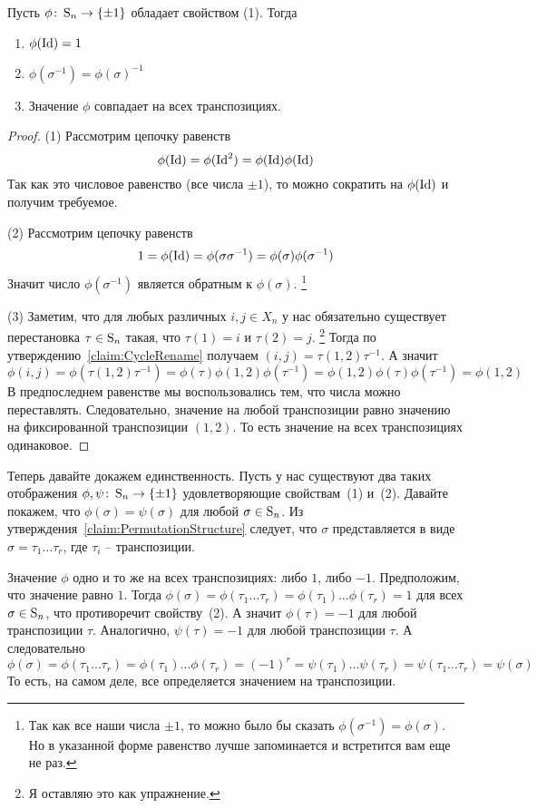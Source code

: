 \begin{claim*}
Пусть $\phi\colon \operatorname{S}_{n}\to \{\pm1\}$ обладает свойством (1).
Тогда
\begin{enumerate}
\item $\phi(\operatorname{Id}) = 1$

\item $\phi(\sigma^{-1}) = \phi(\sigma)^{-1}$

\item Значение $\phi$ совпадает на всех транспозициях.
\end{enumerate}
\end{claim*}
\begin{proof}
(1) Рассмотрим цепочку равенств
\[
\phi(\operatorname{Id}) = \phi(\operatorname{Id}^2) = \phi(\operatorname{Id})\phi(\operatorname{Id})
\]
Так как это числовое равенство (все числа $\pm 1$), то можно сократить на $\phi(\operatorname{Id})$ и получим требуемое.


(2) Рассмотрим цепочку равенств
\[
1 = \phi(\operatorname{Id}) = \phi(\sigma \sigma^{-1}) = \phi(\sigma)\phi(\sigma^{-1})
\]
Значит число $\phi(\sigma^{-1})$ является обратным к $\phi(\sigma)$.%
\footnote{Так как все наши числа $\pm 1$, то можно было бы сказать $\phi(\sigma^{-1}) = \phi(\sigma)$.
Но в указанной форме равенство лучше запоминается и встретится вам еще не раз.}

(3) Заметим, что для любых различных $i, j\in X_n$ у нас обязательно существует перестановка $\tau\in\operatorname{S}_{n}$ такая, что $\tau(1) = i$ и $\tau(2) = j$.%
\footnote{Я оставляю это как упражнение.}
Тогда по утверждению~\ref{claim:CycleRename} получаем $(i,j) = \tau (1,2)\tau^{-1}$.
А значит
\[
\phi(i,j) = \phi(\tau (1,2) \tau^{-1}) = \phi(\tau)\phi(1,2)\phi(\tau^{-1}) = \phi(1,2)\phi(\tau)\phi(\tau^{-1}) = \phi(1,2)
\]
В предпоследнем равенстве мы воспользовались тем, что числа можно переставлять.
Следовательно, значение на любой транспозиции равно значению на фиксированной транспозиции $(1,2)$.
То есть значение на всех транспозициях одинаковое.
\end{proof}

Теперь давайте докажем единственность.
Пусть у нас существуют два таких отображения $\phi, \psi\colon \operatorname{S}_{n}\to \{\pm 1\}$ удовлетворяющие свойствам~(1) и~(2).
Давайте покажем, что $\phi(\sigma) = \psi(\sigma)$ для любой $\sigma\in\operatorname{S}_{n}$.
Из утверждения~\ref{claim:PermutationStructure}  следует, что $\sigma$ представляется в виде $\sigma = \tau_1\ldots\tau_r$, где $\tau_i$ -- транспозиции.

Значение $\phi$ одно и то же на всех транспозициях: либо $1$, либо $-1$.
Предположим, что значение равно $1$.
Тогда $\phi(\sigma) = \phi(\tau_1\ldots\tau_r) = \phi(\tau_1)\ldots\phi(\tau_r) = 1$ для всех $\sigma\in\operatorname{S}_{n}$, что противоречит свойству~(2).
А значит $\phi(\tau) = -1$ для любой транспозиции $\tau$.
Аналогично, $\psi(\tau) = -1$ для любой транспозиции $\tau$.
А следовательно
\[
\phi(\sigma) = \phi(\tau_1\ldots\tau_r) = \phi(\tau_1)\ldots\phi(\tau_r) = (-1)^r =\psi(\tau_1)\ldots\psi(\tau_r) = \psi(\tau_1\ldots\tau_r)=\psi(\sigma)
\]
То есть, на самом деле, все определяется значением на транспозиции.


